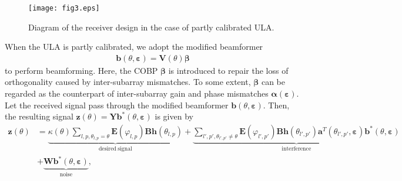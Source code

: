 \documentclass[12pt, draftclsnofoot, onecolumn]{IEEEtran}
\begin{document}
\begin{figure}[t]
\setlength{\abovecaptionskip}{-0.5cm}
\setlength{\belowcaptionskip}{-1cm}
\begin{center}
\texttt{[image: fig3.eps]}
\end{center}
\caption{ Diagram of the receiver design in the case of partly calibrated ULA.}
\end{figure}

When the ULA is partly calibrated, we adopt the modified beamformer
\begin{align}
\mathbf{b}\left( \theta , \boldsymbol{\varepsilon } \right)= \mathbf{V}\left( \theta  \right)\boldsymbol{\beta }
\end{align}
to perform beamforming. Here, the COBP $\boldsymbol{\beta }$ is introduced to repair the loss of orthogonality caused by inter-subarray mismatches. To some extent, $\boldsymbol{\beta }$ can be regarded as the counterpart of inter-subarray gain and phase mismatches $\boldsymbol{\alpha}(\boldsymbol{\varepsilon}) $.
Let the received signal pass through the modified beamformer $\mathbf{b}\left( \theta , \boldsymbol{\varepsilon } \right)$. Then, the resulting signal $\mathbf{z}\left( \theta  \right) =\mathbf{Y}{{\mathbf{b}}^{\text{*}}}\left( \theta , \boldsymbol{\varepsilon } \right)$ is given by
\begin{align}
\mathbf{z}\left( \theta  \right) & =\underbrace{ \kappa\left( \theta  \right) \sum\limits_{l,p, {{\theta }_{l,p}}=\theta }{\mathbf{E}\left( {{\varphi }_{l,p}} \right)\mathbf{Bh}\left( {{\theta }_{l,p}} \right)}}_{\mathrm{desired \ signal}} +\underbrace{\sum\limits_{l', p', {{\theta }_{l',p'}}\ne \theta }{\mathbf{E}\left( {{\varphi }_{l',p'}} \right)\mathbf{Bh}\left( {{\theta }_{l',p'}} \right){{\mathbf{a}}^{T}}\left( {{\theta }_{l', p'}}, \boldsymbol{\varepsilon } \right){{\mathbf{b}}^{\text{*}}}\left( \theta , {\boldsymbol{\varepsilon}}  \right)}}_{\mathrm{interference}} \nonumber \\
& + \underbrace{\mathbf{W}{{\mathbf{b}}^{\text{*}}}\left( \theta , \boldsymbol{\varepsilon } \right)}_{\mathrm{noise}},
\end{align}
\end{document}
